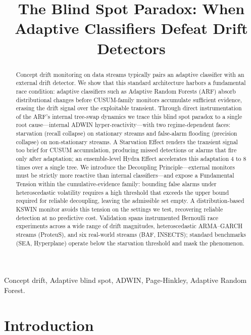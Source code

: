 \documentclass[10pt,conference]{IEEEtran}
\title{The Blind Spot Paradox: When Adaptive Classifiers Defeat Drift Detectors}
\author{\IEEEauthorblockN{Anonymous Author(s)}
\IEEEauthorblockA{\textit{Anonymous Affiliation(s)}\\
Paper under Triple-Blind Review}}
\theoremstyle{definition}
\begin{document}
\maketitle

\begin{abstract}
  Concept drift monitoring on data streams typically pairs an adaptive classifier with an external drift detector. We show that this standard architecture harbors a fundamental race condition: adaptive classifiers such as Adaptive Random Forests (ARF) absorb distributional changes before CUSUM-family monitors accumulate sufficient evidence, erasing the drift signal over the exploitable transient. Through direct instrumentation of the ARF's internal tree-swap dynamics we trace this blind spot paradox to a single root cause---internal ADWIN hyper-reactivity---with two regime-dependent faces: starvation (recall collapse) on stationary streams and false-alarm flooding (precision collapse) on non-stationary streams. A Starvation Effect renders the transient signal too brief for CUSUM accumulation, producing missed detections or alarms that fire only after adaptation; an ensemble-level Hydra Effect accelerates this adaptation 4 to 8 times over a single tree. We introduce the Decoupling Principle---external monitors must be strictly more reactive than internal classifiers---and expose a Fundamental Tension within the cumulative-evidence family: bounding false alarms under heteroscedastic volatility requires a high threshold that exceeds the upper bound required for reliable decoupling, leaving the admissible set empty. A distribution-based KSWIN monitor avoids this tension on the settings we test, recovering reliable detection at no predictive cost. Validation spans instrumented Bernoulli race experiments across a wide range of drift magnitudes, heteroscedastic ARMA--GARCH streams (ProteuS), and six real-world streams (BAF, INSECTS); standard benchmarks (SEA, Hyperplane) operate below the starvation threshold and mask the phenomenon.
\end{abstract}

\begin{IEEEkeywords}
  Concept drift, Adaptive blind spot, ADWIN, Page-Hinkley, Adaptive Random Forest.
\end{IEEEkeywords}

\section{Introduction}\label{sec:intro}
\end{document}
